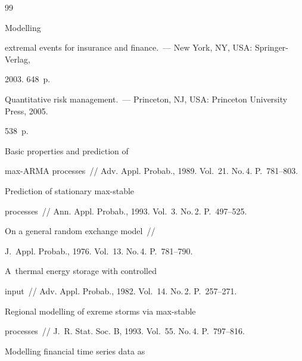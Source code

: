 {\small\frenchspacing


{%




\begin{thebibliography}{99}







 Modelling


extremal events for insurance and finance.~--- New York, NY, USA: Springer-Verlag, 


2003. 648~p.






Quantitative risk management.~--- Princeton, NJ, USA: Princeton University Press, 2005.


 538~p.




 Basic properties and prediction of


max-ARMA processes~/\!\!/ Adv. Appl. Probab., 1989. Vol.~21. No.\,4. P.~781--803.




 Prediction of stationary max-stable


processes~/\!\!/ Ann. Appl. Probab., 1993. Vol.~3. No.\,2. P.~497--525.




 On a general random exchange model~/\!\!/


J.~Appl. Probab., 1976. Vol.~13. No.\,4. P.~781--790.




 A~thermal energy storage with controlled


input~/\!\!/ Adv. Appl. Probab., 1982. Vol.~14. No.\,2. P.~257--271.




 Regional modelling of exreme storms via max-stable


processes~/\!\!/ J.~R. Stat. Soc. B, 1993. Vol.~55. No.\,4. P.~797--816.




 Modelling financial time series data as



\end{thebibliography}}}

